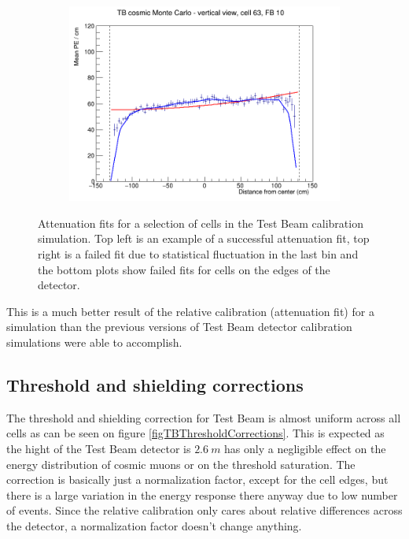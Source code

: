 \documentclass[12pt,a4paper]{article}
\begin{document}
\begin{figure}[h]
\begin{subfigure}{0.5\textwidth}
  \end{subfigure}
  \begin{subfigure}{0.5\textwidth}
    \includegraphics[width=\linewidth]{RelativeCalibrationResults/sim_fb10_000_063.png}
  \end{subfigure}
  \caption{Attenuation fits for a selection of cells in the Test Beam calibration simulation. Top left is an example of a successful attenuation fit, top right is a failed fit due to statistical fluctuation in the last bin and the bottom plots show failed fits for cells on the edges of the detector.}
  \label{figAttenfitResultsSimulation}
\end{figure}

This is a much better result of the relative calibration (attenuation fit) for a simulation than the previous versions of Test Beam detector calibration simulations were able to accomplish.

\subsection{Threshold and shielding corrections}
The threshold and shielding correction for Test Beam is almost uniform across all cells as can be seen on figure \ref{figTBThresholdCorrections}. This is expected as the hight of the Test Beam detector is $2.6\ \unit{m}$ has only a negligible effect on the energy distribution of cosmic muons or on the threshold saturation. The correction is basically just a normalization factor, except for the cell edges, but there is a large variation in the energy response there anyway due to low number of events. Since the relative calibration only cares about relative differences across the detector, a normalization factor doesn't change anything.
\end{document}
